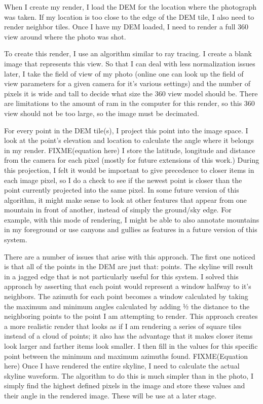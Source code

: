 \documentclass{acm_proc_article-sp}
\begin{document}
When I create my render, I load the DEM for the location where the photograph was taken.   If my location is too close to the edge of the DEM tile, I also need to render  neighbor tiles.  Once I have my DEM loaded, I need to render a full 360 view around where the photo was shot.  

To create this render, I use an algorithm similar to ray tracing.  I create a blank image that represents this view.  So that I can deal with less normalization issues later, I take the field of view of my photo (online one can look up the field of view parameters for a given camera for it’s various settings) and the number of pixels it is wide and tall to decide what size the 360 view model should be.  There are limitations to the amount of ram in the computer for this render, so this 360 view should not be too large, so the image must be decimated.

For every point in the DEM tile(s), I project this point into the image space.  I look at the point’s elevation and location to calculate the angle where it belongs in my render.  FIXME(equation here) I store the latitude, longitude and distance from the camera for each pixel (mostly for future extensions of this work.) During this projection, I felt it would be important to give precedence to closer items in each image pixel, so I do a check to see if the newest point is closer than the point currently projected into the same pixel.  In some future version of this algorithm, it might make sense to look at other features that appear from one mountain in front of another, instead of simply the ground/sky edge. For example, with this mode of rendering, I might be able to also annotate mountains in my foreground or use canyons and gullies as features in a future version of this system.

There are a number of issues that arise with this approach.  The first one noticed is that all of the points in the DEM are just that: points.  The skyline will result in a jagged edge that is not particularly useful for this system.  I solved this approach by asserting that each point would represent a window halfway to it’s neighbors.  The azimuth for each point becomes a window calculated by taking the maximum and minimum angles calculated by adding ½ the distance to the neighboring points to the point I am attempting to render.  This approach creates a more realistic render that looks as if I am rendering a series of square tiles instead of a cloud of points; it also has the advantage that it makes closer items look larger and farther items look smaller.  I then fill in the values for this specific point between the minimum and maximum azimuths found. FIXME(Equation here)
    Once I have rendered the entire skyline, I need to calculate the actual skyline waveform.  The algorithm to do this is much simpler than in the photo, I simply find the highest defined pixels in the image and store these values and their angle in the rendered image. These will be use at a later stage.
\end{document}
